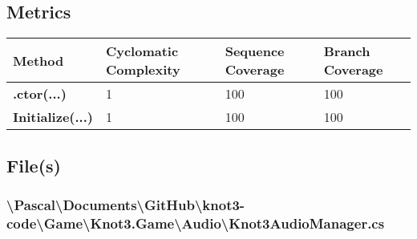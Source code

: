 \documentclass[a4paper,10pt]{article}
\begin{document}
\subsection{Metrics}
\begin{longtable}[l]{|l|l|l|l|}
\hline
\textbf{Method} & \textbf{Cyclomatic Complexity} & \textbf{Sequence Coverage} & \textbf{Branch Coverage}\\
\hline
\textbf{.ctor(...)} & 1 & 100 & 100\\
\hline
\textbf{Initialize(...)} & 1 & 100 & 100\\
\hline
\end{longtable}
\subsection{File(s)}
\subsubsection{\textbackslash Pascal\textbackslash Documents\textbackslash GitHub\textbackslash knot3-code\textbackslash Game\textbackslash Knot3.Game\textbackslash Audio\textbackslash Knot3AudioManager.cs}
\end{document}
